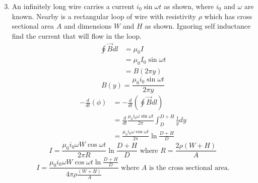 \documentclass[fleqn]{article}
\begin{document}
	\begin{enumerate}
		\setcounter{enumi}{2}
		\item 
			An infinitely long wire carries a current $i_0\sin{\omega t}$ as shown, where $i_0$ and $\omega$ are known. Nearby is a rectangular loop of wire with resistivity $\rho$ which has cross sectional area $A$ and dimensions $W$ and $H$ as shown. Ignoring self inductance find the current that will flow in the loop.
			\begin{align*}
				\oint\vec{B}dl &= \mu_0I\\
								  &= \mu_0I_0\sin{\omega t}\\
								  &= B(2\pi y)
			\end{align*}
			$$B(y) = \frac{\mu_0i_0\sin{\omega t}}{2\pi y}$$
			\begin{align*}
				-\frac{d}{dt}(\phi) &= -\frac{d}{dt}(\oint\vec{B}dl)\\
									   &= \frac{d}{dt}\frac{\mu_0i_0\omega\sin{\omega t}}{2\pi}\int_{D}^{D+H}\frac{1}{y}dy\\
									   &= \frac{\mu_0i_0\omega\cos{\omega t}}{2\pi}\ln{\frac{D+H}{D}}
			\end{align*}
			$$I = \frac{\mu_0i_0\omega W\cos{\omega t}}{2\pi R}\ln{\frac{D+H}{D}} \text{ where } R = \frac{2\rho(W+H)}{A}$$
			$$I = \frac{\mu_0i_0\omega W\cos{\omega t}\ln{\frac{D+H}{D}}}{4\pi\rho\frac{(W+H)}{A}}  \text{ where } A \text{ is the cross sectional area.}$$
	\end{enumerate}
\end{document}
